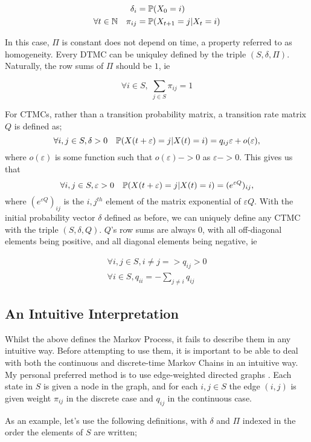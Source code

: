 \begin{align*}
\delta_i &= \mathbb{P} (X_0 = i) \\
 \forall t \in \mathbb{N} \quad \pi_{ij} &= \mathbb{P}(X_{t+1} = j | X_t = i)
\end{align*}

In this case, $\Pi$ is constant does not depend on time, a property referred to as homogeneity. Every DTMC can be uniquley defined by the triple $(S,\delta,\Pi)$. Naturally, the row sums of $\Pi$ should be $1$, ie

$$
\forall i \in S, \; \sum_{j \in S} \pi_{ij} = 1
$$

For CTMCs, rather than a transition probability matrix, a transition rate matrix $Q$ is defined as;
$$
\forall i,j \in S, \delta>0 \quad \mathbb{P} (X(t+\varepsilon)=j|X(t)=i) = q_{ij}\varepsilon + o(\varepsilon),
$$
where $o(\varepsilon)$ is some function such that $o(\varepsilon) -> 0$ as $\varepsilon -> 0$. This gives us that
$$
\forall i,j \in S, \varepsilon>0 \quad \mathbb{P} (X(t+\varepsilon)=j|X(t)=i) = (e^{\varepsilon Q})_{ij},
$$
where $(e^{\varepsilon Q})_{ij}$ is the $i,j^{th}$ element of the matrix exponential of $\varepsilon Q$. With the initial probability vector $\delta$ defined as before, we can uniquely define any CTMC with the triple $(S,\delta,Q)$. $Q$'s row sums are always 0, with all off-diagonal elements being positive, and all diagonal elements being negative, ie

\begin{align*}
\forall i,j \in S, i \neq j => q_{ij} > 0 \\
\forall i \in S, q_{ii} = -\sum_{j \neq i} q_{ij}
\end{align*}

\subsection{An Intuitive Interpretation}

Whilst the above defines the Markov Process, it fails to describe them in any intuitive way. Before attempting to use them, it is important to be able to deal with both the continuous and discrete-time Markov Chains in an intuitive way. My personal preferred method is to use edge-weighted directed graphs \cite{mwgraph}. Each state in $S$ is given a node in the graph, and for each $i,j \in S$ the edge $(i,j)$ is given weight $\pi_{ij}$ in the discrete case and $q_{ij}$ in the continuous case.

As an example, let's use the following definitions, with $\delta$ and $\Pi$ indexed in the order the elements of $S$ are written;

